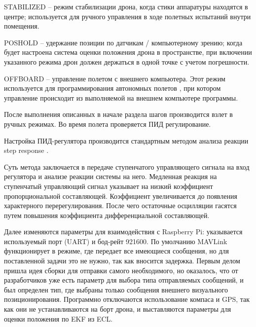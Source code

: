 STABILIZED -- режим стабилизации дрона, когда стики аппаратуры находятся в центре; используется для ручного управления в ходе полетных испытаний внутри помещения.

POSHOLD -- удержание позиции по датчикам / компьютерному зрению; когда будет настроена система оценки положения дрона в пространстве, при включении указанного режима дрон должен держаться в одной точке с учетом погрешности.

OFFBOARD -- управление полетом с внешнего компьютера. Этот режим используется для программирования автономных полетов \cite{clover}, при котором управление происходит из выполняемой на внешнем компьютере программы.

После выполнения описанных в начале раздела шагов производится взлет в ручных режимах. Во время полета проверяется ПИД регулирование.

Настройка ПИД-регулятора производится стандартным методом анализа реакции step res\-ponse \cite{step}.

Суть метода заключается в передаче ступенчатого управляющего сигнала на вход регулятора и анализе реакции системы на него.
Медленная реакция на ступенчатый управляющий сигнал указывает на низкий коэффициент пропорциональной составляющей.
Коэффициент увеличивается до появления характерного перерегулирования.
После чего остаточные осцилляции гасятся путем повышения коэффициента дифференциальной составляющей.

Далее изменяются параметры для взаимодействия с Raspberry Pi: указывается используемый порт (UART) и бод-рейт 921600.
По умолчанию MAV\-Link функционирует в режиме, где передает все имеющиеся сообщения, но для поставленной задачи это не нужно, так как вносится задержка. Первым делом пришла идея сборки для отправки самого необходимого, но оказалось, что от разработчиков уже есть параметр для выбора типа отправляемых сообщений, и был определен тип, где выбраны только сообщения внешнего визуального позиционирования.
Программно отключаются использование компаса и GPS, так как они не устанавливаются на борт дрона, и выставляются параметры для оценки положения по EKF из ECL.

